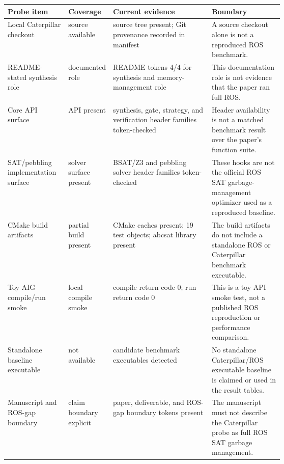 \begin{tabularx}{\linewidth}{>{\raggedright\arraybackslash}p{0.22\linewidth}>{\raggedright\arraybackslash}p{0.15\linewidth}>{\raggedright\arraybackslash}X>{\raggedright\arraybackslash}p{0.26\linewidth}}
\toprule
Probe item & Coverage & Current evidence & Boundary \\
\midrule
Local Caterpillar checkout & source available & source tree present; Git provenance recorded in manifest & A source checkout alone is not a reproduced ROS benchmark. \\
README-stated synthesis role & documented role & README tokens 4/4 for synthesis and memory-management role & This documentation role is not evidence that the paper ran full ROS. \\
Core API surface & API present & 4 synthesis, gate, strategy, and verification header families token-checked & Header availability is not a matched benchmark result over the paper's function suite. \\
SAT/pebbling implementation surface & solver surface present & 3 BSAT/Z3 and pebbling solver header families token-checked & These hooks are not the official ROS SAT garbage-management optimizer used as a reproduced baseline. \\
CMake build artifacts & partial build present & CMake caches present; 19 test objects; abcsat library present & The build artifacts do not include a standalone ROS or Caterpillar benchmark executable. \\
Toy AIG compile/run smoke & local compile smoke & compile return code 0; run return code 0 & This is a toy API smoke test, not a published ROS reproduction or performance comparison. \\
Standalone baseline executable & not available & 0 candidate benchmark executables detected & No standalone Caterpillar/ROS executable baseline is claimed or used in the result tables. \\
Manuscript and ROS-gap boundary & claim boundary explicit & paper, deliverable, and ROS-gap boundary tokens present & The manuscript must not describe the Caterpillar probe as full ROS SAT garbage management. \\
\bottomrule
\end{tabularx}
